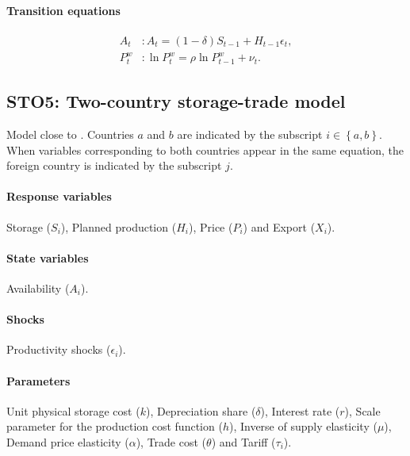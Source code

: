 \documentclass[11pt,fleqn]{article}
\newcommand{\Pw}{P^{w}}
\begin{document}
\paragraph{Transition equations}

\begin{align}
  A_{t}&: A_{t}=\left(1-\delta\right)S_{t-1}+H_{t-1}\epsilon_{t},\\
  \Pw_{t}&: \ln \Pw_{t} = \rho\ln \Pw_{t-1}+\nu_{t}.
\end{align}



\subsection{STO5: Two-country storage-trade model}
\label{sec:two-country-storage}

Model close to \citet{Mira95}. Countries $a$ and $b$ are indicated by the subscript
$i \in \left\{a,b\right\}$. When variables corresponding to both countries appear
in the same equation, the foreign country is indicated by the subscript $j$.

\paragraph{Response variables}
\label{sec:response-variables}

Storage ($S_{i}$), Planned production ($H_{i}$), Price ($P_{i}$) and Export ($X_{i}$).

\paragraph{State variables}
\label{sec:state-variable}

Availability ($A_{i}$).

\paragraph{Shocks}
\label{sec:shock}

Productivity shocks ($\epsilon_{i}$).

\paragraph{Parameters}
\label{sec:parameters}

Unit physical storage cost ($k$), Depreciation share ($\delta$), Interest rate
($r$), Scale parameter for the production cost function ($h$), Inverse of supply
elasticity ($\mu$), Demand price elasticity ($\alpha$), Trade cost ($\theta$) and
Tariff ($\tau_{i}$).
\end{document}
